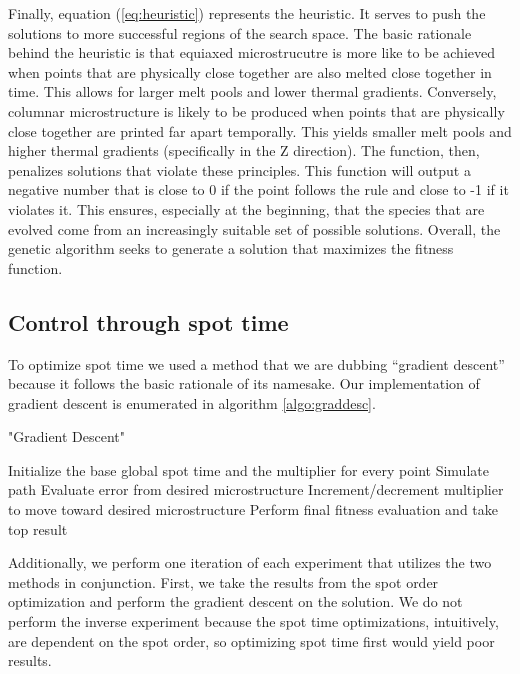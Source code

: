 \documentclass[a4paper]{article}
\begin{document}
Finally, equation (\ref{eq:heuristic}) represents the heuristic. It serves to push the solutions to more successful regions of the search space. The basic rationale behind the heuristic is that equiaxed microstrucutre is more like to be achieved when points that are physically close together are also melted close together in time. This allows for larger melt pools and lower thermal gradients. Conversely, columnar microstructure is likely to be produced when points that are physically close together are printed far apart temporally. This yields smaller melt pools and higher thermal gradients (specifically in the Z direction). The function, then, penalizes solutions that violate these principles. This function will output a negative number that is close to 0 if the point follows the rule and close to -1 if it violates it. This ensures, especially at the beginning, that the species that are evolved come from an increasingly suitable set of possible solutions. Overall, the genetic algorithm seeks to generate a solution that maximizes the fitness function.


\subsection{Control through spot time}
\label{subsec:spottime}

To optimize spot time we used a method that we are dubbing “gradient descent” because it follows the basic rationale of its namesake. Our implementation of gradient descent is enumerated in algorithm \ref{algo:graddesc}. 

\begin{algorithm}
\caption{"Gradient Descent"}
\label{algo:graddesc}
\begin{algorithmic}[1]
\State Initialize the base global spot time and the multiplier for every point
  \State Simulate path
    \State Evaluate error from desired microstructure
    \State Increment/decrement multiplier to move toward desired microstructure
  \EndFor
\EndWhile
\State Perform final fitness evaluation and take top result
\end{algorithmic}
\end{algorithm}


Additionally, we perform one iteration of each experiment that utilizes the two methods in conjunction. First, we take the results from the spot order optimization and perform the gradient descent on the solution. We do not perform the inverse experiment because the spot time optimizations, intuitively, are dependent on the spot order, so optimizing spot time first would yield poor results. 
\end{document}
